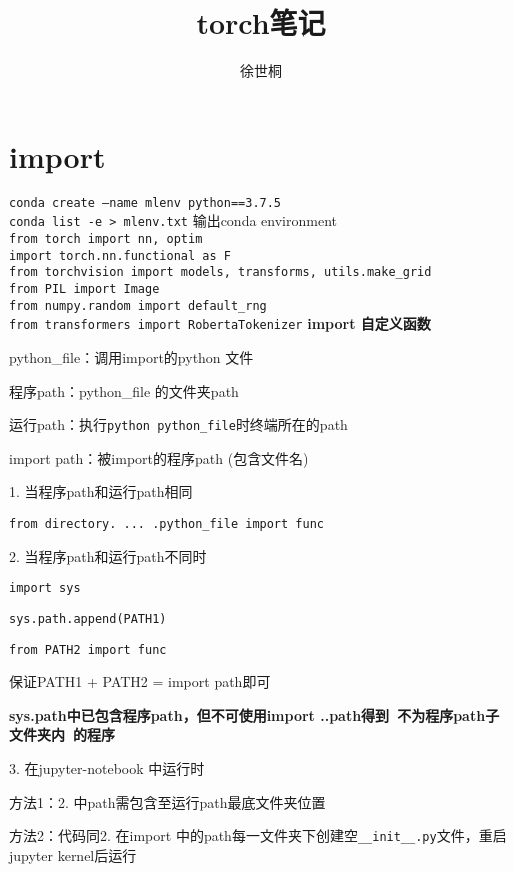 \documentclass[UTF8]{ctexart}
\title{torch笔记}
\author{徐世桐}
\date{}
\begin{document}
\maketitle

\section{import}
\noindent \texttt{conda create --name mlenv python==3.7.5}\\
\texttt{conda list -e > mlenv.txt} 输出conda environment\\
\texttt{from torch import nn, optim}\\
\texttt{import torch.nn.functional as F}\\
\texttt{from torchvision import models, transforms, utils.make\_grid}\\
\texttt{from PIL import Image}\\
\texttt{from numpy.random import default\_rng}\\
\texttt{from transformers import RobertaTokenizer}
\textbf{import 自定义函数}

  python\_file：调用import的python 文件

  程序path：python\_file 的文件夹path

  运行path：执行\texttt{python python\_file}时终端所在的path

  import path：被import的程序path (包含文件名)

  1. 当程序path和运行path相同

  \quad \texttt{from directory. ... .python\_file import func}

  2. 当程序path和运行path不同时

  \quad \texttt{import sys}

  \quad \texttt{sys.path.append(PATH1)}

  \quad \texttt{from PATH2 import func}

  \quad \quad 保证PATH1 + PATH2 = import path即可

  \quad \textbf{sys.path中已包含程序path，但不可使用import ..path得到\ 不为程序path子文件夹内\ 的程序}

  3. 在jupyter-notebook 中运行时

  \quad 方法1：2. 中path需包含至运行path最底文件夹位置

  \quad 方法2：代码同2. 在import 中的path每一文件夹下创建空\texttt{\_\_init\_\_.py}文件，重启jupyter kernel后运行
\end{document}
